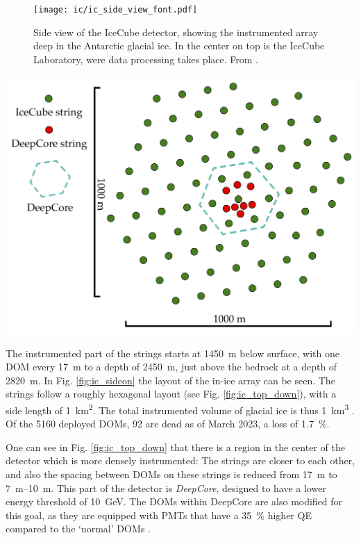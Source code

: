 \documentclass[
    a4paper, %
    fontsize=10pt, %
    twoside=false, %
    numbers=noenddot, %
    fontmethod=tex,
]{kaobook}
\begin{document}
\begin{figure}
    \texttt{[image: ic/ic\_side\_view\_font.pdf]}
    \caption[IceCube side-on]{Side view of the IceCube detector, showing the instrumented array deep in the Antarctic glacial ice. In the center on top is the IceCube Laboratory, were data processing takes place. From \cite{Ahlers2018a}.}
\end{figure}
\begin{marginfigure}
    \includegraphics{ic/ic_top_view.pdf}
    \caption[IceCube top-down view]{Top-down view of the IceCube detector, spanning \SI{1}{\square\km} on the surface. From \cite{Ahlers2018a}.}
\end{marginfigure}

The instrumented part of the strings starts at \SI{1450}{\m} below surface, with one DOM every \SI{17}{\m} to a depth of \SI{2450}{\m}, just above the bedrock at a depth of \SI{2820}{\m}. In Fig. \ref{fig:ic_sideon} the layout of the in-ice array can be seen. The strings follow a roughly hexagonal layout (see Fig. \ref{fig:ic_top_down}), with a side length of \SI{1}{\km\squared}. The total instrumented volume of glacial ice is thus \SI{1}{\km\cubed} \cite{Aartsen2017}. Of the 5160 deployed DOMs, 92 are dead as of March 2023, a loss of \SI{1.7}{\percent}.

One can see in Fig. \ref{fig:ic_top_down} that there is a region in the center of the detector which is more densely instrumented: The strings are closer to each other, and also the spacing between DOMs on these strings is reduced from \SI{17}{\m} to \SIrange{7}{10}{\m}. This part of the detector is \textit{DeepCore}, designed to have a lower energy threshold of \SI{10}{\GeV}. The DOMs within DeepCore are also modified for this goal, as they are equipped with PMTs that have a \SI{35}{\percent} higher QE compared to the `normal' DOMs \cite{Aartsen2017}. 
\end{document}
